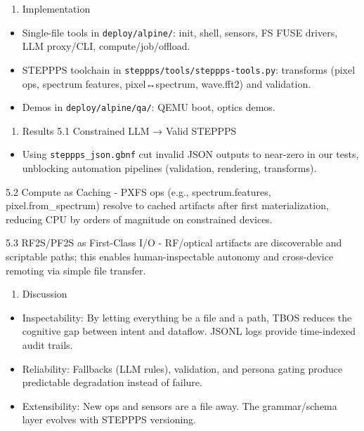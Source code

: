 \documentclass[]{article}
\providecommand{\tightlist}{%
  \setlength{\itemsep}{0pt}\setlength{\parskip}{0pt}}
\begin{document}
\begin{enumerate}
\def\labelenumi{\arabic{enumi}.}
\setcounter{enumi}{3}
\tightlist
\item
  Implementation
\end{enumerate}

\begin{itemize}
\tightlist
\item
  Single-file tools in \texttt{deploy/alpine/}: init, shell, sensors, FS
  FUSE drivers, LLM proxy/CLI, compute/job/offload.
\item
  STEPPPS toolchain in \texttt{steppps/tools/steppps-tools.py}:
  transforms (pixel ops, spectrum features, pixel↔spectrum, wave.fft2)
  and validation.
\item
  Demos in \texttt{deploy/alpine/qa/}: QEMU boot, optics demos.
\end{itemize}

\begin{enumerate}
\def\labelenumi{\arabic{enumi}.}
\setcounter{enumi}{4}
\tightlist
\item
  Results 5.1 Constrained LLM → Valid STEPPPS
\end{enumerate}

\begin{itemize}
\tightlist
\item
  Using \texttt{steppps\_json.gbnf} cut invalid JSON outputs to
  near-zero in our tests, unblocking automation pipelines (validation,
  rendering, transforms).
\end{itemize}

5.2 Compute as Caching - PXFS ops (e.g., spectrum.features,
pixel.from\_spectrum) resolve to cached artifacts after first
materialization, reducing CPU by orders of magnitude on constrained
devices.

5.3 RF2S/PF2S as First-Class I/O - RF/optical artifacts are discoverable
and scriptable paths; this enables human-inspectable autonomy and
cross-device remoting via simple file transfer.

\begin{enumerate}
\def\labelenumi{\arabic{enumi}.}
\setcounter{enumi}{5}
\tightlist
\item
  Discussion
\end{enumerate}

\begin{itemize}
\tightlist
\item
  Inspectability: By letting everything be a file and a path, TBOS
  reduces the cognitive gap between intent and dataflow. JSONL logs
  provide time-indexed audit trails.
\item
  Reliability: Fallbacks (LLM rules), validation, and persona gating
  produce predictable degradation instead of failure.
\item
  Extensibility: New ops and sensors are a file away. The grammar/schema
  layer evolves with STEPPPS versioning.
\end{itemize}
\end{document}
